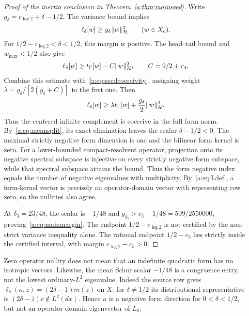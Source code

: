 \documentclass[11pt,a4paper]{article}
\numberwithin{equation}{section}
\theoremstyle{definition}\newtheorem{definition}[theorem]{Definition}
\theoremstyle{remark}\newtheorem{remark}[theorem]{Remark}
\newcommand{\Hh}{\mathcal H}\newcommand{\Hw}{\mathcal H}
\newcommand{\tg}{t_\Gamma}\newcommand{\cg}{c_\Gamma}
\begin{document}
\begin{proof}[Proof of the inertia conclusion in Theorem~\ref{a:thm:mainseed}]
Write $g_\delta=c_{\log2}+\delta-1/2$. The variance bound implies
\begin{equation}\label{a:eq:seedcoercivity}
 \ell_\delta[w]\ge g_\delta\norm w_{\Hh}^2\qquad(w\in X_c).
\end{equation}
For $1/2-c_{\log2}<\delta<1/2$, this margin is positive. The head--tail bound and $w_{\max}<1/2$ also give
\[
 \ell_\delta[w]\ge\tg[w]-C\norm w_{\Hh}^2,
 \qquad C=9/2+r_4.
\]
Combine this estimate with~\eqref{a:eq:seedcoercivity}, assigning weight
$\lambda=g_\delta/[2(g_\delta+C)]$ to the first one. Then
\begin{equation}\label{a:eq:fullseedcoercivity}
 \ell_\delta[w]\ge\lambda\tg[w]
                         +\frac{g_\delta}{2}\norm w_{\Hh}^2.
\end{equation}
Thus the centered infinite complement is coercive in the full form norm. By~\eqref{a:eq:meansplit}, its exact elimination leaves the scalar $\delta-1/2<0$. The maximal strictly negative form dimension is one and the bilinear form kernel is zero. For a lower-bounded compact-resolvent operator, projection onto its negative spectral subspace is injective on every strictly negative form subspace, while that spectral subspace attains the bound. Thus the form negative index equals the number of negative eigenvalues with multiplicity. By~\eqref{a:eq:Ldef}, a form-kernel vector is precisely an operator-domain vector with representing row zero, so the nullities also agree.

At $\delta_3=23/48$, the scalar is $-1/48$ and
$g_{\delta_3}>c_3-1/48=509/2550000$, proving~\eqref{a:eq:mainmargin}.
The endpoint $1/2-c_{\log2}$ is not certified by the non-strict variance inequality alone. The rational endpoint $1/2-c_3$ lies strictly inside the certified interval, with margin $c_{\log2}-c_3>0$.
\end{proof}

Zero operator nullity does not mean that an indefinite quadratic form has no isotropic vectors. Likewise, the mean Schur scalar $-1/48$ is a congruence entry, not the lowest ordinary-$L^2$ eigenvalue. Indeed the source row gives
$\ell_\delta(\kappa,z)=(2\delta-1)\overline{m(z)}$ on $X$; for $\delta\ne1/2$ its distributional representative is $(2\delta-1)c\notin L^2(dx)$. Hence $\kappa$ is a negative form direction for $0<\delta<1/2$, but not an operator-domain eigenvector of $L_\delta$.
\end{document}
